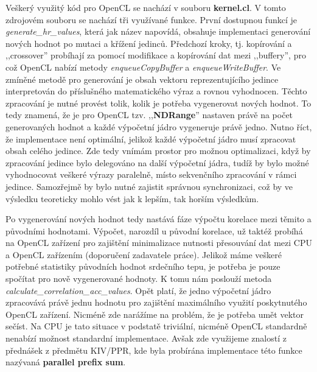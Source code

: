 \documentclass[12pt, a4paper]{article}
\begin{document}
Veškerý využitý kód pro OpenCL se nachází v souboru \textbf{kernel.cl}.
V tomto zdrojovém souboru se nachází tři využívané funkce. 
První dostupnou funkcí je \textit{generate\_hr\_values}, která jak název napovídá, obsahuje implementaci generování nových hodnot po mutaci a křížení jedinců.
Předchozí kroky, tj. kopírování a ,,crossover'' probíhají za pomocí modifikace a kopírování dat mezi ,,buffery'', pro což OpenCL nabízí metody \textit{enqueueCopyBuffer} a \textit{enqueueWriteBuffer}.
Ve zmíněné metodě pro generování je obsah vektoru reprezentujícího jedince interpretován do příslušného matematického výraz a rovnou vyhodnocen.
Těchto zpracování je nutné provést tolik, kolik je potřeba vygenerovat nových hodnot.
To tedy znamená, že je pro OpenCL tzv. ,,\textbf{NDRange}'' nastaven právě na počet generovaných hodnot a každé výpočetní jádro vygeneruje právě jedno.
Nutno říct, že implementace není optimální, jelikož každé výpočetní jádro musí zpracovat obsah celého jedince.
Zde tedy vnímám prostor pro možnou optimalizaci, když by zpracování jedince bylo delegováno na další výpočetní jádra, tudíž by bylo možné vyhodnocovat veškeré výrazy paralelně, místo sekvenčního zpracování v rámci jedince.
Samozřejmě by bylo nutné zajistit správnou synchronizaci, což by ve výsledku teoreticky mohlo vést jak k lepším, tak horším výsledkům.

Po vygenerování nových hodnot tedy nastává fáze výpočtu korelace mezi těmito a původními hodnotami. 
Výpočet, narozdíl u původní korelace, už taktéž probíhá na OpenCL zařízení pro zajištění minimalizace nutnosti přesouvání dat mezi CPU a OpenCL zařízením (doporučení zadavatele práce).
Jelikož máme veškeré potřebné statistiky původních hodnot srdečního tepu, je potřeba je pouze spočítat pro nově vygenerované hodnoty.
K tomu nám poslouží metoda \textit{calculate\_correlation\_acc\_values}.
Opět platí, že jedno výpočetní jádro zpracovává právě jednu hodnotu pro zajištění maximálního využití poskytnutého OpenCL zařízení.
Nicméně zde narážíme na problém, že je potřeba umět vektor sečíst. 
Na CPU je tato situace v podstatě triviální, nicméně OpenCL standardně nenabízí možnost standardní implementace.
Avšak zde využijeme znalostí z přednášek z předmětu KIV/PPR, kde byla probírána implementace této funkce nazývaná \textbf{parallel prefix sum}.
\end{document}
